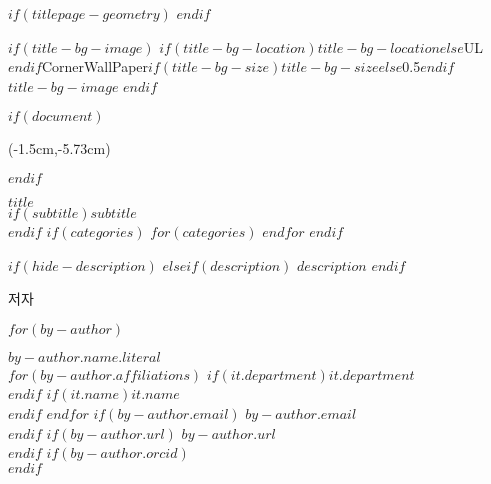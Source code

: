 
$if(titlepage-geometry)$
$endif$
\begin{minipage}[b][\textheight][s]{\textwidth}
\raggedright

$if(title-bg-image)$
\This$if(title-bg-location)$$title-bg-location$$else$UL$endif$CornerWallPaper{$if(title-bg-size)$$title-bg-size$$else$0.5$endif$}{$title-bg-image$}
$endif$

$if(document)$
\newfontfamily{}
\begin{textblock*}{\textwidth}(-1.5cm,-5.73cm)  %
  {\kpubbold\large{}}
\end{textblock*}
$endif$

{\Huge\bfseries{$title$}}\\[1\baselineskip]
$if(subtitle)${\LARGE{$subtitle$}}\\[1\baselineskip]$endif$
$if(categories)$
  $for(categories)$
  $endfor$
\vspace{3mm}
$endif$

$if(hide-description)$
$elseif(description)$
    $description$
$endif$

\begin{titlepagebox}



\textcolor{anugold}{저자}
\vspace{-3mm}
\begin{multicols}{2}
$for(by-author)$
    \begin{minipage}{\columnwidth}
    \raggedright
    \normalfont
    {\textbf{$by-author.name.literal$}}\\
    $for(by-author.affiliations)$
    $if(it.department)${$it.department$}\\$endif$
    $if(it.name)${\itshape{$it.name$}}\\$endif$
    $endfor$
    $if(by-author.email)$ $by-author.email$\\$endif$
    $if(by-author.url)$ $by-author.url$\\$endif$
    $if(by-author.orcid)$\\$endif$
    \vspace{4mm}
    \end{minipage}


\end{multicols}
\end{titlepagebox}
\end{minipage}
